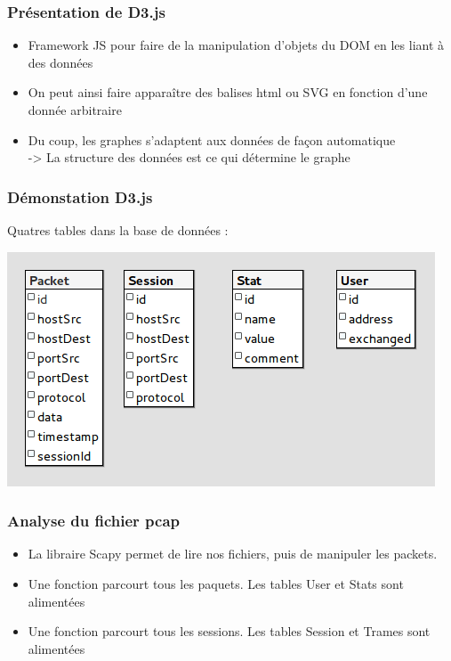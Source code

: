 \documentclass{beamer}
\begin{document}
  \begin{frame}
  \frametitle{Présentation de D3.js}
   \begin{itemize}
    \item Framework JS pour faire de la manipulation d'objets du DOM en les
    liant à des données
    \item On peut ainsi faire apparaître des balises html ou SVG en fonction
    d'une donnée arbitraire
    \item Du coup, les graphes s'adaptent aux données de façon automatique
    \\-\textgreater \hspace{0.3mm} La structure des données est ce qui détermine
    le graphe
   \end{itemize}
  \end{frame}
  
  \begin{frame}
  \frametitle{Démonstation D3.js}
  \end{frame}

  \begin{frame}
   Quatres tables dans la base de données :
   \begin{center}
    \includegraphics[scale=0.6]{postgre.png}
   \end{center}
  \end{frame}
  
  \begin{frame}
    \frametitle{Analyse du fichier pcap}
    \begin{itemize}
     \item La libraire Scapy permet de lire nos fichiers, puis de manipuler les packets.
     \item Une fonction parcourt tous les paquets. Les tables User et Stats sont alimentées 
     \item Une fonction parcourt tous les sessions. Les tables Session et Trames sont alimentées
    \end{itemize}
  \end{frame}
  
\end{document}
